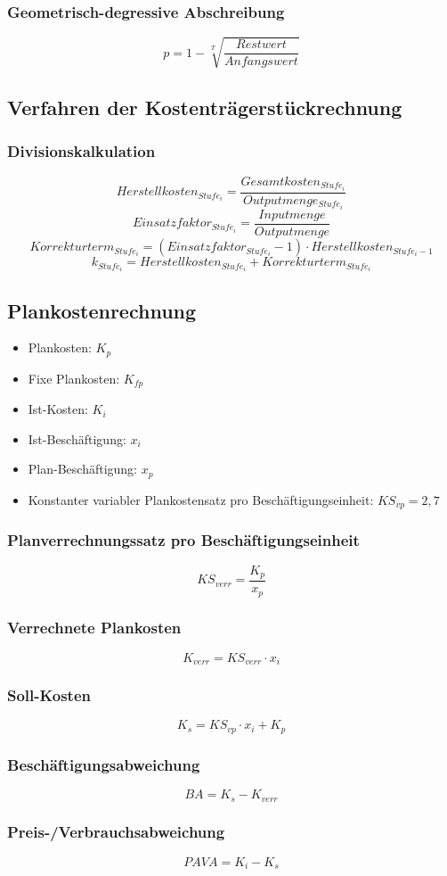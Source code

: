 \subsubsection{Geometrisch-degressive Abschreibung}
\[p = 1 - \sqrt[T]{\frac{Restwert}{Anfangswert}}\]


\subsection{Verfahren der Kostenträgerstückrechnung}

\subsubsection{Divisionskalkulation}
\[Herstellkosten_{Stufe_i} = \frac{Gesamtkosten_{Stufe_i}}{Outputmenge_{Stufe_i}}\]
\[Einsatzfaktor_{Stufe_i}=\frac{Inputmenge}{Outputmenge}\]
\[Korrekturterm_{Stufe_i} = (Einsatzfaktor_{Stufe_i}-1)\cdot Herstellkosten_{Stufe_i-1}\]
\[k_{Stufe_i} = Herstellkosten_{Stufe_i}+Korrekturterm_{Stufe_i}\]


\subsection{Plankostenrechnung}
\begin{itemize}
	\item Plankosten: \(K_p\)
	\item Fixe Plankosten: \(K_{fp}\)
	\item Ist-Kosten: \(K_i\)
	\item Ist-Beschäftigung: \(x_i\)
	\item Plan-Beschäftigung: \(x_p\)
	\item Konstanter variabler Plankostensatz pro Beschäftigungseinheit: \(KS_{vp}=2,7\)
\end{itemize}

\subsubsection{Planverrechnungssatz pro Beschäftigungseinheit}
\[KS_{verr} = \frac{K_p}{x_p}\]

\subsubsection{Verrechnete Plankosten}
\[K_{verr} = KS_{verr} \cdot x_i\]

\subsubsection{Soll-Kosten}
\[K_s = KS_{vp} \cdot x_i + K_p\]

\subsubsection{Beschäftigungsabweichung}
\[BA = K_s - K_{verr}\]

\subsubsection{Preis-/Verbrauchsabweichung}
\[PAVA = K_i - K_s\]
